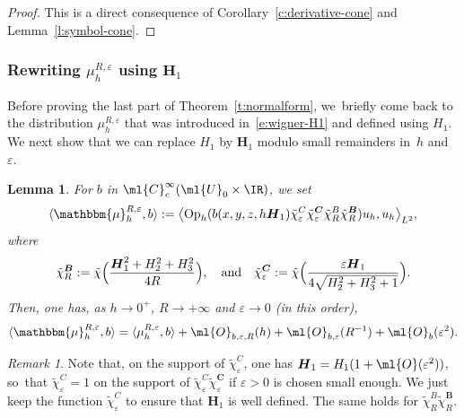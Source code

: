 \documentclass[10pt]{amsart}
\let\bm\mathbbm
\theoremstyle{plain}
\newtheorem{lemm}[theo]{Lemma}
\theoremstyle{definition}
\theoremstyle{remark}
\newtheorem{rema}[theo]{Remark}
\newcommand{\Op}{\operatorname{Op}}
\begin{document}
\begin{proof}
This is a direct consequence of Corollary~\ref{c:derivative-cone} and Lemma~\ref{l:symbol-cone}.
\end{proof}

\subsubsection{Rewriting $\mu_{h}^{R,\varepsilon}$ using $\boldsymbol{H}_1$}

Before proving the last part of Theorem~\ref{t:normalform}, we~briefly come back to the distribution $\mu_{h}^{R,\varepsilon}$ that was introduced in~\eqref{e:wigner-H1} and defined using $H_1$. We next show that we can replace $H_1$ by $\boldsymbol{H}_1$ modulo small remainders in~$h$ and~$\varepsilon$.

\begin{lemm}\label{l:wigner} For $b$ in $\ml{C}^\infty_c(\ml{U}_0\times\IR)$, we set
\begin{equation}
\label{e:black_mu}
\langle \bm{\mu}_{h}^{R,\varepsilon},b\rangle:=\bigl\langle \Op_h(b(x,y,z,h\boldsymbol{H}_1)\tilde{\chi}_\varepsilon^C\tilde{\chi}_\varepsilon^{\boldsymbol{C}}\tilde{\chi}_R^B\tilde{\chi}_R^{\boldsymbol{B}})u_h,u_h\bigr\rangle_{L^2},
\end{equation}
where
\[
\tilde{\chi}_R^{\boldsymbol{B}}:=\tilde{\chi}\Bigl(\frac{\boldsymbol{H}_1^2+H_2^2+H_3^2}{4R}\Bigr),\quad\text{and}\quad\tilde{\chi}_\varepsilon^{\boldsymbol{C}}:=\tilde{\chi}\Bigl(\frac{\varepsilon \boldsymbol{H}_1}{4\sqrt{H_2^2+H_3^2+1}}\Bigr).
\]
Then, one has, as $h\to 0^+$, $R\to+\infty$ and $\varepsilon\to 0$ (in this order),
\[
\langle\bm{\mu}_{h}^{R,\varepsilon},b\rangle=\langle\mu_{h}^{R,\varepsilon},b\rangle+\ml{O}_{b,\varepsilon,R}(h)+\ml{O}_{b,\varepsilon}(R^{-1})+\ml{O}_b(\varepsilon^2).
\]
\end{lemm}
\begin{rema}\label{r:support}
Note that, on the support of $\tilde{\chi}_\varepsilon^C$, one has $\boldsymbol{H}_1=H_1(1+\ml{O}(\varepsilon^2))$, so~that $\tilde{\chi}_\varepsilon^C=1$ on the support of $\tilde{\chi}_\varepsilon^C\tilde{\chi}_\varepsilon^{\boldsymbol{C}}$ if $\varepsilon>0$ is chosen small enough. We just keep the function $\tilde{\chi}_\varepsilon^C$ to ensure that $\boldsymbol{H}_1$ is well defined. The same holds for $\tilde{\chi}_R^B\tilde{\chi}_R^{\boldsymbol{B}}$.
\end{rema}
\end{document}
